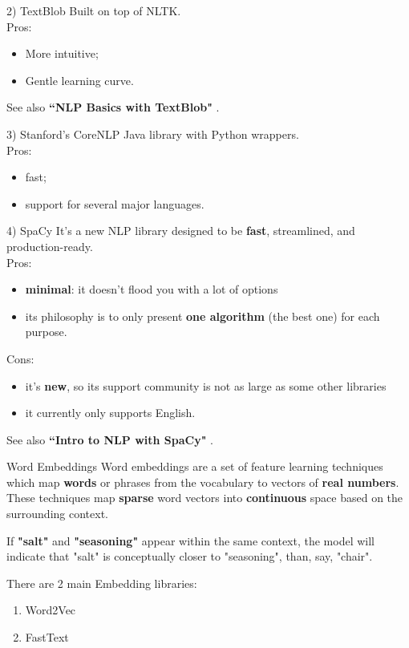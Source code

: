 \documentclass[xcolor=dvipsnames]{beamer}
\begin{document}
\begin{frame}{2) TextBlob}
Built on top of NLTK.\\
Pros:
\begin{itemize}
\item More intuitive;
\item Gentle learning curve.
\end{itemize}
See also \textbf{``NLP Basics with TextBlob"} \cite{p7}.
\end{frame}

\begin{frame}{3) Stanford's CoreNLP}
Java library with Python wrappers.\\
Pros: 
\begin{itemize}
\item fast;
\item support for several major languages.
\end{itemize}
\end{frame}

\begin{frame}{4) SpaCy}
It's a new NLP library  designed to be \textbf{fast}, streamlined, and production-ready.\\
Pros:
\begin{itemize}
\item \textbf{minimal}: it doesn't flood you with a lot of options
\item its philosophy is to only present \textbf{one algorithm} (the best one) for each purpose.
\end{itemize}
Cons:
\begin{itemize}
\item it's \textbf{new}, so its support community is not as large as some other libraries
\item it currently only supports English.
\end{itemize}
See also \textbf{``Intro to NLP with SpaCy"} \cite{p8}. 
\end{frame}

\begin{frame}{Word Embeddings}
Word embeddings are a set of feature learning techniques which map \textbf{words} or phrases from the vocabulary to vectors of \textbf{real numbers}. \\
These techniques map \textbf{sparse} word vectors into \textbf{continuous} space based on the surrounding context.\\
\begin{Example}
If \textbf{"salt"} and \textbf{"seasoning"} appear within the same context, the model will indicate that "salt" is conceptually closer to "seasoning", than, say, "chair". 
\end{Example}
There are 2 main Embedding libraries:
\begin{enumerate}
\item Word2Vec
\item FastText
\end{enumerate}
\end{frame}
\end{document}
